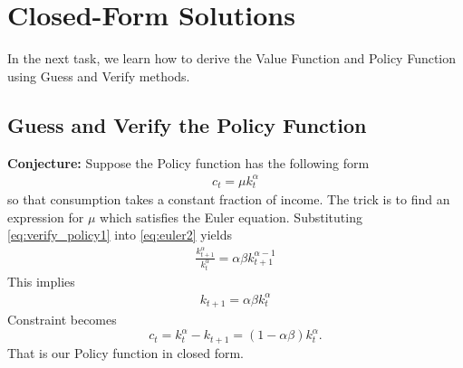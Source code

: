 \documentclass[11pt,a4paper]{book}
\theoremstyle{definition}\newtheorem{definition}{Definition}
\theoremstyle{definition}\newtheorem{fact}{Fact}
\theoremstyle{definition}\newtheorem{remark}{Remark}
\theoremstyle{definition}\newtheorem{ex}{Ex.}
\theoremstyle{definition}\newtheorem{project}{Project}
\theoremstyle{definition}\newtheorem{problem}{Problem}
\theoremstyle{definition}\newtheorem{example}{Example}
\numberwithin{theorem}{section}
\numberwithin{corollary}{chapter}
\numberwithin{assumption}{chapter}
\numberwithin{definition}{chapter}
\numberwithin{prop}{chapter}
\numberwithin{notation}{chapter}
\numberwithin{problem}{chapter}
\numberwithin{example}{chapter}
\numberwithin{fact}{chapter}
\numberwithin{ex}{chapter}
\begin{document}
	\section{Closed-Form Solutions}
	In the next task, we learn how to derive the Value Function and Policy Function using Guess and Verify methods.
	
	\subsection{Guess and Verify the Policy Function}
	\textbf{Conjecture:} Suppose the Policy function has the following form
	\begin{align}
		c_t = \mu k_t^\alpha \label{eq:verify_policy1}
	\end{align}
	so that consumption takes a constant fraction of income. The trick is to find an expression for $\mu$ which satisfies the Euler equation. Substituting \eqref{eq:verify_policy1} into \eqref{eq:euler2} yields
	\begin{align*}
		\frac{k_{t+1}^\alpha}{k_t^\alpha} = \alpha \beta k_{t+1}^{\alpha-1}
	\end{align*}
	This implies
	\begin{align*}
		k_{t+1}  = \alpha\beta k_t^\alpha
	\end{align*}
	Constraint becomes
	\begin{equation*}
		c_t = k_t^\alpha - k_{t+1} = (1-\alpha\beta)k_t^\alpha.
	\end{equation*}
	That is our Policy function in closed form.
		
\end{document}
